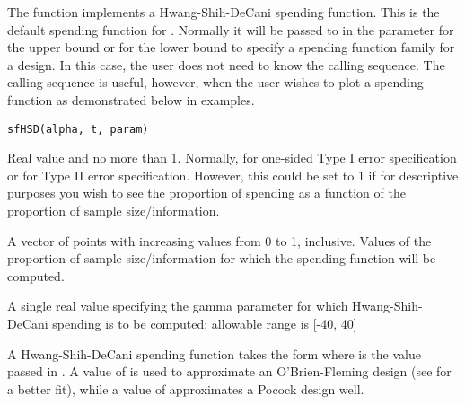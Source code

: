 \begin{Description}\relax
The function  implements a Hwang-Shih-DeCani spending function.
This is the default spending function for .
Normally it will be passed to  in the parameter  for the upper bound or
 for the lower bound to specify a spending function family for a design.
In this case, the user does not need to know the calling sequence.
The calling sequence is useful, however, when the user wishes to plot a spending function as demonstrated below
in examples.
\end{Description}
\begin{Usage}
\begin{verbatim}
sfHSD(alpha, t, param)
\end{verbatim}
\end{Usage}
\begin{Arguments}
\begin{ldescription}
\item[\code{alpha}] Real value  and no more than 1. Normally, 
 for one-sided Type I error specification or  for Type II error specification. However, this could be set to 1 if for descriptive purposes you wish to see the proportion of spending as a function of the proportion of sample size/information.
\item[\code{t}] A vector of points with increasing values from 0 to 1, inclusive. Values of the proportion of sample size/information for which the spending function will be computed.
\item[\code{param}] A single real value specifying the gamma parameter for which Hwang-Shih-DeCani spending is to be computed; allowable range is [-40, 40]
\end{ldescription}
\end{Arguments}
\begin{Details}\relax
A Hwang-Shih-DeCani spending function takes the form
where  is the value passed in .
A value of  is used to approximate an O'Brien-Fleming design (see  for a better fit), 
while a value of  approximates a Pocock design well.
\end{Details}
